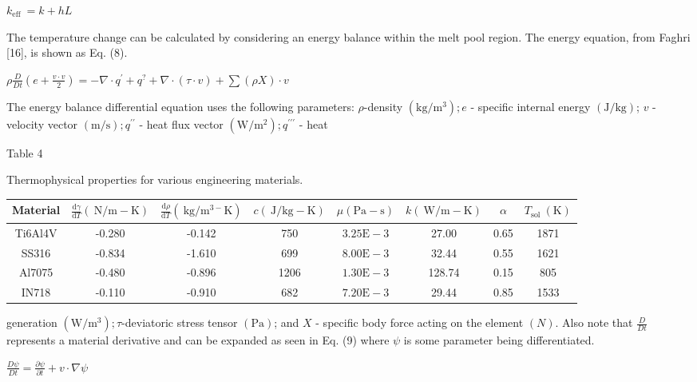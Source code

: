 \documentclass[10pt]{article}
\begin{document}
$k_{\text {eff }}=k+h L$

The temperature change can be calculated by considering an energy balance within the melt pool region. The energy equation, from Faghri [16], is shown as Eq. (8).

$\rho \frac{D}{D t}\left(e+\frac{v \cdot v}{2}\right)=-\nabla \cdot q^{\prime}+q^{?}+\nabla \cdot(\tau \cdot v)+\sum(\rho X) \cdot v$

The energy balance differential equation uses the following parameters: $\rho$-density $\left(\mathrm{kg} / \mathrm{m}^{3}\right) ; e$ - specific internal energy $(\mathrm{J} / \mathrm{kg})$; $v$ - velocity vector $(\mathrm{m} / \mathrm{s}) ; q^{\prime \prime}$ - heat flux vector $\left(\mathrm{W} / \mathrm{m}^{2}\right) ; q^{\prime \prime \prime}$ - heat

Table 4

Thermophysical properties for various engineering materials.

\begin{center}
\begin{tabular}{|c|c|c|c|c|c|c|c|}
\hline
Material & $\frac{\mathrm{d} \gamma}{\mathrm{d} T}(\mathrm{~N} / \mathrm{m}-\mathrm{K})$ & $\frac{\mathrm{d} \rho}{\mathrm{d} T}\left(\mathrm{~kg} / \mathrm{m}^{3-} \mathrm{K}\right)$ & $c(\mathrm{~J} / \mathrm{kg}-\mathrm{K})$ & $\mu(\mathrm{Pa}-\mathrm{s})$ & $k(\mathrm{~W} / \mathrm{m}-\mathrm{K})$ & $\alpha$ & $T_{\text {sol }}(\mathrm{K})$ \\
\hline
Ti6Al4V & -0.280 & -0.142 & 750 & $3.25 \mathrm{E}-3$ & 27.00 & 0.65 & 1871 \\
\hline
SS316 & -0.834 & -1.610 & 699 & $8.00 \mathrm{E}-3$ & 32.44 & 0.55 & 1621 \\
\hline
Al7075 & -0.480 & -0.896 & 1206 & $1.30 \mathrm{E}-3$ & 128.74 & 0.15 & 805 \\
\hline
IN718 & -0.110 & -0.910 & 682 & $7.20 \mathrm{E}-3$ & 29.44 & 0.85 & 1533 \\
\hline
\end{tabular}
\end{center}

generation $\left(\mathrm{W} / \mathrm{m}^{3}\right) ; \tau$-deviatoric stress tensor $(\mathrm{Pa})$; and $X$ - specific body force acting on the element $(N)$. Also note that $\frac{D}{D t}$ represents a material derivative and can be expanded as seen in Eq. (9) where $\psi$ is some parameter being differentiated.

$\frac{D \psi}{D t}=\frac{\partial \psi}{\partial t}+v \cdot \nabla \psi$
\end{document}
